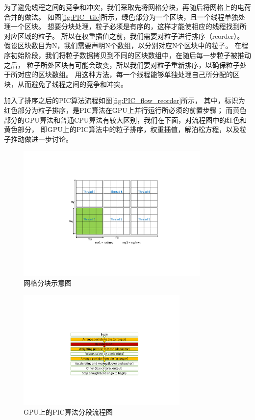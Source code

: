 为了避免线程之间的竞争和冲突，我们采取先将网格分块，再随后将网格上的电荷合并的做法。
如图\eqref{fig:PIC_tile}所示，绿色部分为一个区块，且一个线程单独处理一个区块。
想要分块处理，粒子必须是有序的，这样才能使相应的线程找到所对应区域的粒子。
所以在权重插值之前，我们需要对粒子进行排序（reorder）。
假设区块数目为N，我们需要声明N个数组，以分别对应N个区块中的粒子。
在程序初始阶段，我们将粒子数据拷贝到不同的区块数组中，在随后每一步粒子被推动之后，
粒子所处区块有可能会改变，所以我们要对粒子重新排序，以确保粒子处于所对应的区块数组。
用这种方法，每一个线程能够单独处理自己所分配的区块，从而避免了线程之间的竞争和冲突。

加入了排序之后的PIC算法流程如图\eqref{fig:PIC_flow_reorder}所示，
其中，标识为红色部分为粒子排序，是PIC算法在GPU上并行运行所必须的前置步骤；
而黄色部分的GPU算法和普通CPU算法有较大区别，我们在下面，对流程图中的红色和黄色部分，
即GPU上的PIC算法中的粒子排序，权重插值，解泊松方程，以及粒子推动做进一步讨论。

\begin{figure}[!htb]
    \centering
    \includegraphics[width=0.85\textwidth]{Img/3PIC_tile.pdf}
    \caption{网格分块示意图}
    \label{fig:PIC_tile}
\end{figure}

\begin{figure}[!htb]
    \centering
    \includegraphics[width=0.75\textwidth]{Img/3PIC_flow_reorder.pdf}
    \caption{GPU上的PIC算法分段流程图}
    \label{fig:PIC_flow_reorder}
\end{figure}



